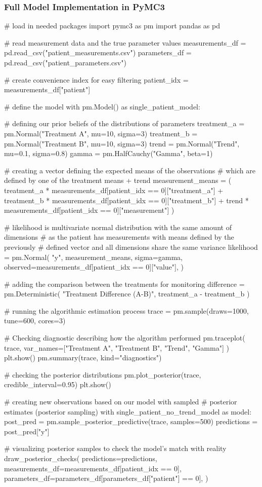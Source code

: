 \documentclass[12pt,a4paper,leqno]{report}
\theoremstyle{plain}
\theoremstyle{definition}
\theoremstyle{remark}
\begin{document}
\subsubsection*{Full Model Implementation in PyMC3}
\bigskip
\begin{pyverbatim}[][fontsize=\footnotesize]
# load in needed packages
import pymc3 as pm
import pandas as pd

# read measurement data and the true parameter values
measurements_df = pd.read_csv("patient_measurements.csv")
parameters_df = pd.read_csv("patient_parameters.csv")

# create convenience index for easy filtering
patient_idx = measurements_df["patient"]
   
# define the model
with pm.Model() as single_patient_model:

    # defining our prior beliefs of the distributions of parameters
    treatment_a = pm.Normal("Treatment A", mu=10, sigma=3)
    treatment_b = pm.Normal("Treatment B", mu=10, sigma=3)
    trend = pm.Normal("Trend", mu=0.1, sigma=0.8)
    gamma = pm.HalfCauchy("Gamma", beta=1)

    # creating a vector defining the expected means of the observations
    # which are defined by one of the treatment means + trend
    measurement_means = (
        treatment_a * measurements_df[patient_idx == 0]["treatment_a"]
        + treatment_b * measurements_df[patient_idx == 0]["treatment_b"]
        + trend * measurements_df[patient_idx == 0]["measurement"]
    )

    # likelihood is multivariate normal distribution with the same amount of dimensions
    # as the patient has measurements with means defined by the previously
    # defined vector and all dimensions share the same variance
    likelihood = pm.Normal(
        "y",
        measurement_means,
        sigma=gamma,
        observed=measurements_df[patient_idx == 0]["value"],
    )

    # adding the comparison between the treatments for monitoring
    difference = pm.Deterministic(
        "Treatment Difference (A-B)", treatment_a - treatment_b
    )

    # running the algorithmic estimation process
    trace = pm.sample(draws=1000, tune=600, cores=3)

    # Checking diagnostic describing how the algorithm performed
    pm.traceplot(
        trace, var_names=["Treatment A", "Treatment B", "Trend", "Gamma"]
    )
    plt.show()
    pm.summary(trace, kind="diagnostics")

    # checking the posterior distributions
    pm.plot_posterior(trace, credible_interval=0.95)
    plt.show()

 
# creating new observations based on our model with sampled
# posterior estimates (posterior sampling)
with single_patient_no_trend_model as model:
    post_pred = pm.sample_posterior_predictive(trace, samples=500)
    predictions = post_pred["y"]

# visualizing posterior samples to check the model's match with reality
draw_posterior_checks(
    predictions=predictions,
    measurements_df=measurements_df[patient_idx == 0],
    parameters_df=parameters_df[parameters_df["patient"] == 0],
)
\end{pyverbatim}
\end{document}
